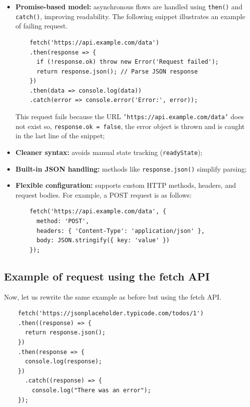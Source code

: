 \documentclass{scrbook}
\begin{document}
	\begin{itemize}
		\item \textbf{Promise-based model:} asynchronous flows are handled using \texttt{then()} and \texttt{catch()}, improving readability. The following snippet illustrates an example of failing request.
		
		\begin{lstlisting}
	fetch('https://api.example.com/data')
	.then(response => {
	  if (!response.ok) throw new Error('Request failed');
	  return response.json(); // Parse JSON response
	})
	.then(data => console.log(data))
	.catch(error => console.error('Error:', error));
		\end{lstlisting}
		
		This request fails because the URL \texttt{'https://api.example.com/data'} does not exist so, \texttt{response.ok = false}, the error object is thrown and is caught in the last line of the snippet;
		
		\item \textbf{Cleaner syntax:} avoids manual state tracking (\texttt{readyState});
		
		\item \textbf{Built-in JSON handling:} methods like \texttt{response.json()} simplify parsing;
		
		\item \textbf{Flexible configuration:} supports custom HTTP methods, headers, and request bodies. For example, a POST request is as follows:
		
		\begin{lstlisting}
	fetch('https://api.example.com/data', {
	  method: 'POST',
	  headers: { 'Content-Type': 'application/json' },
	  body: JSON.stringify({ key: 'value' })
	});
		\end{lstlisting}
	\end{itemize}
	
	\subsection{Example of request using the fetch API}
	
	Now, let us rewrite the same example as before but using the fetch API.
	
	\begin{lstlisting}
	fetch('https://jsonplaceholder.typicode.com/todos/1')
	.then((response) => {
	  return response.json();
	})
	.then(response => {
	  console.log(response);
	})
	  .catch((response) => {
		console.log("There was an error");
	});
	\end{lstlisting}
	
\end{document}
